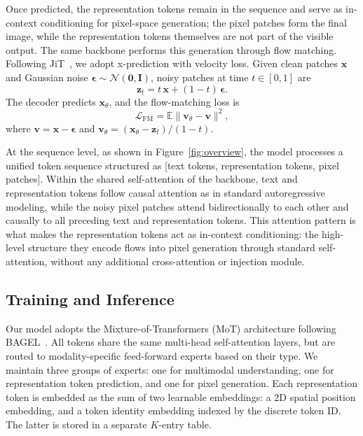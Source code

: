\documentclass{llmxive}
\begin{document}
Once predicted, the representation tokens remain in the sequence and serve as in-context conditioning for pixel-space generation; the pixel patches form the final image, while the representation tokens themselves are not part of the visible output. The same backbone performs this generation through flow matching. Following JiT~\cite{jit}, we adopt x-prediction with velocity loss. Given clean patches $\mathbf{x}$ and Gaussian noise $\boldsymbol{\epsilon} \sim \mathcal{N}(\mathbf{0}, \mathbf{I})$, noisy patches at time $t \in [0, 1]$ are
\begin{equation}
    \mathbf{z}_t = t\,\mathbf{x} + (1 - t)\,\boldsymbol{\epsilon}.
\end{equation}
The decoder predicts $\mathbf{x}_\theta$, and the flow-matching loss is
\begin{equation}
    \mathcal{L}_{\text{FM}} = \mathbb{E} \big\| \mathbf{v}_\theta - \mathbf{v} \big\|^2,
\end{equation}
where $\mathbf{v} = \mathbf{x} - \boldsymbol{\epsilon}$ and $\mathbf{v}_\theta = (\mathbf{x}_\theta - \mathbf{z}_t)/(1 - t)$.



At the sequence level, as shown in Figure~\ref{fig:overview}, the model processes a unified token sequence structured as [text tokens, representation tokens, pixel patches]. Within the shared self-attention of the backbone, text and representation tokens follow causal attention as in standard autoregressive modeling, while the noisy pixel patches attend bidirectionally to each other and causally to all preceding text and representation tokens. This attention pattern is what makes the representation tokens act as in-context conditioning: the high-level structure they encode flows into pixel generation through standard self-attention, without any additional cross-attention or injection module.


\subsection{Training and Inference}
\label{sec:3.3}
Our model adopts the Mixture-of-Transformers (MoT) architecture following BAGEL~\cite{bagel}. All tokens share the same multi-head self-attention layers, but are routed to modality-specific feed-forward experts based on their type. We maintain three groups of experts: one for multimodal understanding, one for representation token prediction, and one for pixel generation. Each representation token is embedded as the sum of two learnable embeddings: a 2D spatial position embedding, and a token identity embedding indexed by the discrete token ID. The latter is stored in a separate $K$-entry table.
\end{document}

